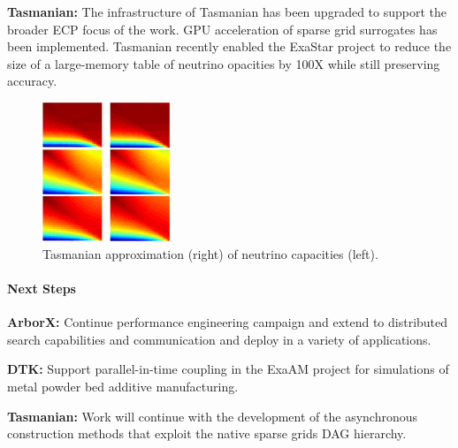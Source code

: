 {\bf Tasmanian:} The infrastructure of Tasmanian has been upgraded to support
the broader ECP focus of the work.  GPU acceleration of sparse grid surrogates
has been implemented.  Tasmanian recently enabled the ExaStar project to
reduce the size of a large-memory table of neutrino opacities by 100X while
still preserving accuracy.

\begin{figure}[htb]
        \centering
        \includegraphics[width=1.5in]{projects/2.3.3-MathLibs/2.3.3.14-ALExa-ForTrilinos/tasmanian-gpu}
        \caption{\label{fig:tasmanian-gpu}Tasmanian approximation (right) of neutrino capacities (left).}
\end{figure}


\paragraph{Next Steps}

\indent

{\bf ArborX:} Continue performance engineering campaign and extend to
distributed search capabilities and communication and deploy in a variety of
applications.

{\bf DTK:} Support parallel-in-time coupling in the ExaAM project for
simulations of metal powder bed additive manufacturing.

{\bf Tasmanian:} Work will continue with the development of the asynchronous
construction methods that exploit the native sparse grids DAG hierarchy.

